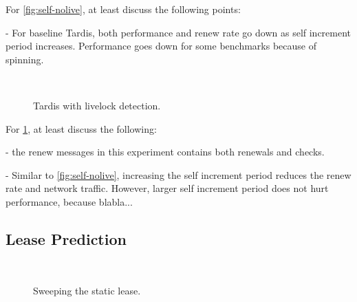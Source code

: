 \documentclass[12pt]{article}
\begin{document}
For \cref{fig:self-nolive}, at least discuss the following points:

- For baseline Tardis, both performance and renew rate go down as self
  increment period increases. Performance goes down for some
  benchmarks because of spinning.

\begin{figure}
	\centering
	\\
	\caption{ Tardis with livelock detection. }
	\label{fig:self-live}
\end{figure}

For \cref{fig:self-live}, at least discuss the following:

- the renew messages in this experiment contains both renewals and 
  checks.

- Similar to \cref{fig:self-nolive}, increasing the self increment 
  period reduces the renew rate and network traffic. However, larger 
  self increment period does not hurt performance, because blabla...

\subsection{Lease Prediction}

\begin{figure}
	\centering
	\\
	\caption{ Sweeping the static lease.  }
	\label{fig:static}
\end{figure}
\end{document}
